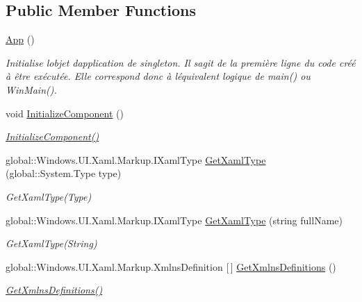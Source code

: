 \subsection*{Public Member Functions}
\begin{DoxyCompactItemize}
\item 
\mbox{\hyperlink{classepicture_1_1_app_ac385b968cfe8c5cbb76009b068cd5009}{App}} ()
\begin{DoxyCompactList}\small\item\em Initialise l\textquotesingle{}objet d\textquotesingle{}application de singleton. Il s\textquotesingle{}agit de la première ligne du code créé à être exécutée. Elle correspond donc à l\textquotesingle{}équivalent logique de main() ou Win\+Main(). \end{DoxyCompactList}\item 
void \mbox{\hyperlink{classepicture_1_1_app_ab502a2fb60a201127ee980272694fa2c}{Initialize\+Component}} ()
\begin{DoxyCompactList}\small\item\em \mbox{\hyperlink{classepicture_1_1_app_ab502a2fb60a201127ee980272694fa2c}{Initialize\+Component()}} \end{DoxyCompactList}\item 
global\+::\+Windows.\+U\+I.\+Xaml.\+Markup.\+I\+Xaml\+Type \mbox{\hyperlink{classepicture_1_1_app_ad07aa9948de2fe3ccf94fc72747f6fe8}{Get\+Xaml\+Type}} (global\+::\+System.\+Type type)
\begin{DoxyCompactList}\small\item\em Get\+Xaml\+Type(\+Type) \end{DoxyCompactList}\item 
global\+::\+Windows.\+U\+I.\+Xaml.\+Markup.\+I\+Xaml\+Type \mbox{\hyperlink{classepicture_1_1_app_a5d41e2aede9485b8010a8c707be7d434}{Get\+Xaml\+Type}} (string full\+Name)
\begin{DoxyCompactList}\small\item\em Get\+Xaml\+Type(\+String) \end{DoxyCompactList}\item 
global\+::\+Windows.\+U\+I.\+Xaml.\+Markup.\+Xmlns\+Definition \mbox{[}$\,$\mbox{]} \mbox{\hyperlink{classepicture_1_1_app_a2e22f01b876b3511e2dbc9241ab1a2cc}{Get\+Xmlns\+Definitions}} ()
\begin{DoxyCompactList}\small\item\em \mbox{\hyperlink{classepicture_1_1_app_a2e22f01b876b3511e2dbc9241ab1a2cc}{Get\+Xmlns\+Definitions()}} \end{DoxyCompactList}\end{DoxyCompactItemize}

